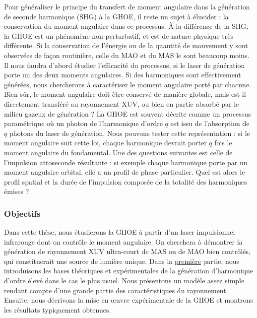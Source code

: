 Pour généraliser le principe du transfert de moment angulaire dans la génération de seconde harmonique (SHG) à la GHOE, il reste un sujet à élucider : la conservation du moment angulaire dans ce processus. \`A la différence de la SHG, la GHOE est un phénomène non-perturbatif, et est de nature physique très différente. Si la conservation de l'énergie ou de la quantité de mouvement y sont observées de façon routinière, celle du MAO et du MAS le sont beaucoup moins. Il nous faudra d'abord étudier l'efficacité du processus, si le laser de génération porte un des deux moments angulaires. Si des harmoniques sont effectivement générées, nous chercherons à caractériser le moment angulaire porté par chacune. Bien sûr, le moment angulaire doit être conservé de manière globale, mais est-il directement transféré au rayonnement XUV, ou bien en partie absorbé par le milieu gazeux de génération ? La GHOE est souvent décrite comme un processus paramétrique où un photon de l'harmonique d'ordre $q$ est issu de l'absorption de $q$ photons du laser de génération. Nous pouvons tester cette représentation : si le moment angulaire suit cette loi, chaque harmonique devrait porter $q$ fois le moment angulaire du fondamental. Une des questions suivantes est celle de l'impulsion attoseconde résultante : si exemple chaque harmonique porte par un moment angulaire orbital, elle a un profil de phase particulier. Quel est alors le profil spatial et la durée de l'impulsion composée de la totalité des harmoniques émises ? 

\subsubsection{Objectifs}
Dans cette thèse, nous étudierons la GHOE à partir d'un laser impulsionnel infrarouge dont on contrôle le moment angulaire. On cherchera à démontrer la génération de rayonnement XUV ultra-court de MAS ou de MAO bien contrôlés, qui constituerait une source de lumière unique. Dans la \hyperref[PA:GHOE]{première} partie, nous introduisons les bases théoriques et expérimentales de la génération d'harmonique d'ordre élevé dans le cas le plus usuel. Nous présentons un modèle assez simple rendant compte d'une grande partie des caractéristiques du rayonnement. Ensuite, nous décrivons la mise en œuvre expérimentale de la GHOE et montrons les résultats typiquement obtenues.

